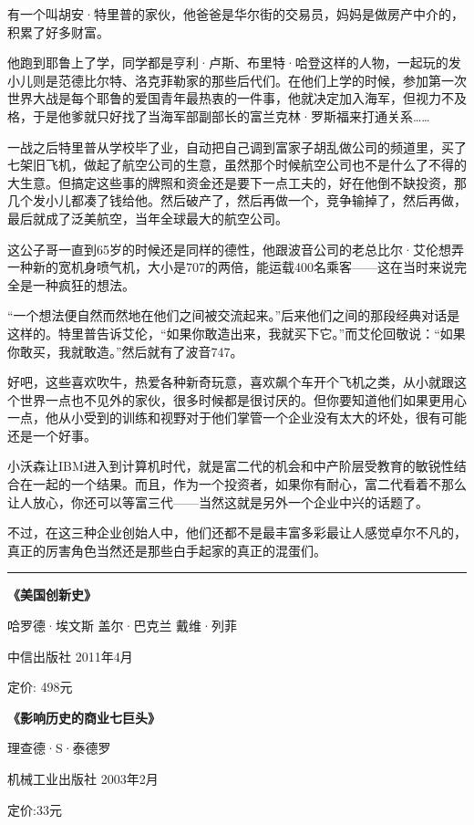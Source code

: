 有一个叫胡安·特里普的家伙，他爸爸是华尔街的交易员，妈妈是做房产中介的，积累了好多财富。

他跑到耶鲁上了学，同学都是亨利·卢斯、布里特·哈登这样的人物，一起玩的发小儿则是范德比尔特、洛克菲勒家的那些后代们。在他们上学的时候，参加第一次世界大战是每个耶鲁的爱国青年最热衷的一件事，他就决定加入海军，但视力不及格，于是他爹就只好找了当海军部副部长的富兰克林·罗斯福来打通关系\ldots\ldots{}

一战之后特里普从学校毕了业，自动把自己调到富家子胡乱做公司的频道里，买了七架旧飞机，做起了航空公司的生意，虽然那个时候航空公司也不是什么了不得的大生意。但搞定这些事的牌照和资金还是要下一点工夫的，好在他倒不缺投资，那几个发小儿都凑了钱给他。然后破产了，然后再做一个，竞争输掉了，然后再做，最后就成了泛美航空，当年全球最大的航空公司。

这公子哥一直到65岁的时候还是同样的德性，他跟波音公司的老总比尔·艾伦想弄一种新的宽机身喷气机，大小是707的两倍，能运载400名乘客------这在当时来说完全是一种疯狂的想法。

``一个想法便自然而然地在他们之间被交流起来。''后来他们之间的那段经典对话是这样的。特里普告诉艾伦，``如果你敢造出来，我就买下它。''而艾伦回敬说：``如果你敢买，我就敢造。''然后就有了波音747。

好吧，这些喜欢吹牛，热爱各种新奇玩意，喜欢飙个车开个飞机之类，从小就跟这个世界一点也不见外的家伙，很多时候都是很讨厌的。但你要知道他们如果更用心一点，他从小受到的训练和视野对于他们掌管一个企业没有太大的坏处，很有可能还是一个好事。

小沃森让IBM进入到计算机时代，就是富二代的机会和中产阶层受教育的敏锐性结合在一起的一个结果。而且，作为一个投资者，如果你有耐心，富二代看着不那么让人放心，你还可以等富三代------当然这就是另外一个企业中兴的话题了。

不过，在这三种企业创始人中，他们还都不是最丰富多彩最让人感觉卓尔不凡的，真正的厉害角色当然还是那些白手起家的真正的混蛋们。

\begin{center}\rule{0.5\linewidth}{0.5pt}\end{center}

\textbf{《美国创新史》}

哈罗德·埃文斯 盖尔·巴克兰 戴维·列菲

中信出版社 2011年4月

定价: 498元

\textbf{《影响历史的商业七巨头》}

理查德·S·泰德罗

机械工业出版社 2003年2月

定价:33元

